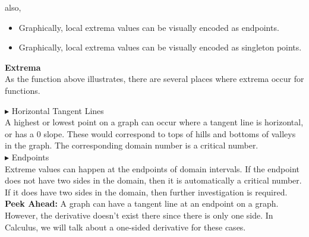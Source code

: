 \documentclass{ximera}
\begin{document}
also, \\

\begin{itemize}
\item Graphically, local extrema values can be visually encoded as endpoints.
\item Graphically, local extrema values can be visually encoded as singleton points.
\end{itemize}












\begin{template} \textbf{\textcolor{blue!55!black}{Extrema}} \\

As the function above illustrates, there are several places where extrema occur for functions.


\textbf{\textcolor{red!70!darkgray}{$\blacktriangleright$}} Horizontal Tangent Lines \\

A highest or lowest point on a graph can occur where a tangent line is horizontal, or has a $0$ slope.  These would correspond to tops of hills and bottoms of valleys in the graph. The corresponding domain number is a critical number. \\




\textbf{\textcolor{red!70!darkgray}{$\blacktriangleright$}} Endpoints \\

Extreme values can happen at the endpoints of domain intervals. If the endpoint does not have two sides in the domain, then it is automatically a critical number.  If it does have two sides in the domain, then further investigation is required. \\

\textbf{\textcolor{red!70!darkgray}{Peek Ahead:}} A graph can have a tangent line at an endpoint on a graph.  However, the derivative doesn't exist there since there is only one side.  In Calculus, we will talk about a one-sided derivative for these cases. \\

\end{template}
\end{document}
